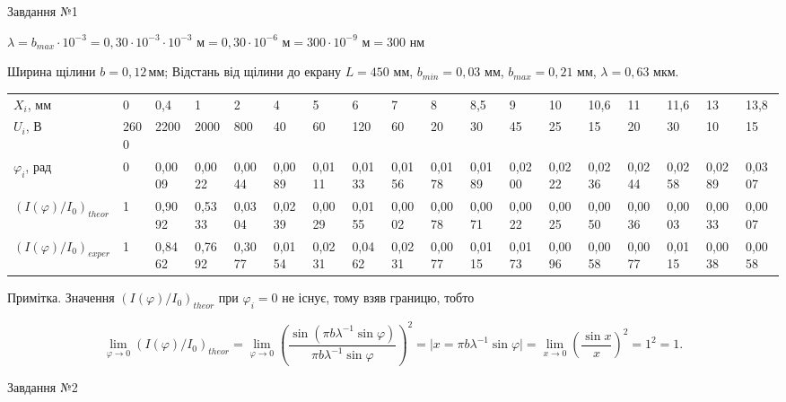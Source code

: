 \documentclass[12pt,a4paper]{article}
\begin{document}
    \setcounter{page}{5}
    \setlength{\parindent}{0pt}

    Завдання №1

    $\lambda = b_{max} \cdot 10^{-3} = 0,30 \cdot 10^{-3} \cdot 10^{-3} \text{ м} = 0,30 \cdot 10^{-6} \text{ м} = 300 \cdot 10^{-9} \text{ м} = 300 \text{ нм}$

    Ширина щілини $b=0{,}12\,$мм; Відстань від щілини до екрану $L = 450$ мм, $b_{min} = 0{,}03$ мм, $b_{max} = 0{,}21$ мм, $\lambda = 0{,}63$ мкм.

    \begin{table}[ht]
        \begin{tabular}{|l|*{17}{l}|}
        \hline
        $X_i$, мм 
            & 0 & 0,4 & 1 & 2 & 4 &
            5 & 6 & 7 & 8 & 8,5 &
            9 & 10 & 10,6 & 11 & 11,6 & 13 & 13,8 \\
        $U_i$, В
            & 2600 & 2200 & 2000 & 800 & 40 & 60 
            & 120 & 60 & 20 & 30 & 45 & 25 
            & 15 & 20 & 30 & 10 & 15 \\
        $\varphi_i$, рад
        & 0 & 0,0009 & 0,0022 & 0,0044 & 0,0089 & 0,0111 & 0,0133 & 0,0156 & 0,0178 & 0,0189 & 0,0200 & 0,0222
        & 0,0236 & 0,0244 & 0,0258 & 0,0289 & 0,0307 \\
        $\left( I(\varphi) \slash I_0 \right)_{theor}$
        & 1 & 0,9092 & 0,5333 & 0,0304 & 0,0239 & 0,0029 & 0,0155 & 0,0002 & 0,0078 & 0,0071 & 0,0022 & 0,0025
        & 0,0050 & 0,0036 & 0,0003 & 0,0033 & 0,0007 \\
        $\left( I(\varphi) \slash I_0 \right)_{exper}$
        & 1 & 0,8462 & 0,7692 & 0,3077 & 0,0154 & 0,0231 & 0,0462 & 0,0231 & 0,0077 & 0,0115 & 0,0173 & 0,0096
        & 0,0058 & 0,0077 & 0,0115 & 0,0038 & 0,0058 \\
        \hline
        \end{tabular}
    \end{table}

    Примітка. Значення $\left( I(\varphi) \slash I_0 \right)_{theor}$ при $\varphi_i = 0$ не існує, тому взяв границю, тобто

    \[
    \lim_{\varphi \rightarrow 0} \left( I(\varphi) \slash I_0 \right)_{theor} = \lim_{\varphi \rightarrow 0} \left( \frac{\sin(\pi b \lambda^{-1} \sin \varphi)}{\pi b \lambda^{-1} \sin \varphi} \right)^2=
    \Big| x = \pi b \lambda^{-1} \sin \varphi \Big| = \lim_{x \rightarrow 0} \left( \frac{\sin x}{x} \right)^2 = 1^2 = 1.
    \]

    Завдання №2
\end{document}
